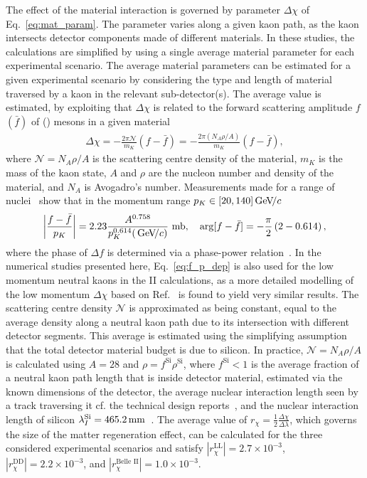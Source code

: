 The effect of the material interaction is governed by parameter $\Delta\chi$ of Eq.~\eqref{eq:mat_param}. The parameter varies along a given kaon path, as the kaon intersects detector components made of different materials. In these studies, the calculations are simplified by using a single average material parameter for each experimental scenario. The average material parameters can be estimated for a given experimental scenario by considering the type and length of material traversed by a kaon in the relevant sub-detector(s). The average value is estimated, by exploiting that $\Delta\chi$ is related to the forward scattering amplitude $f$ $(\bar f)$ of \Kz (\Kzb) mesons in a given material~\cite{goodRelationScatteringAbsorption1957,fetscherRegenerationArbitraryCoherent1996}
\begin{align}\label{eq:mat_delta_chi}
    \Delta \chi = - \frac{2\pi \mathcal{N}}{m_K}(f-\bar f) = - \frac{2\pi (N_A \rho/A)}{m_K}(f-\bar f),
\end{align}
where $\mathcal{N}=N_A\rho/A$ is the scattering centre density of the material, $m_K$ is the mass of the kaon state,  $A$ and $\rho$ are the nucleon number and density of the material, and $N_A$ is Avogadro's number.
Measurements made for a range of nuclei~\cite{Gsponer1979} show that in the momentum range $p_K\in [20, 140]\text{\,Ge\kern -0.1em V\!/}c$
\begin{align} \label{eq:f_p_dep}
    \left|\frac{f-\bar f}{p_K}\right| = 2.23 \frac{A^{0.758}} {p_K^{0.614} (\text{\,Ge\kern -0.1em V\!/}c)} \text{ mb}, \quad \arg [f - \bar f] = -\frac{\pi}{2}\left(2-0.614\right),
\end{align}
where the phase of $\Delta f$ is determined via a phase-power relation~\cite{Briere1995}. In the numerical studies presented here, Eq.~\eqref{eq:f_p_dep} is also used for the low momentum neutral kaons in the \belle II calculations, as a more detailed modelling of the low momentum $\Delta\chi$ based on Ref.~\cite{Ko2011} is found to yield very similar results. The scattering centre density $\mathcal{N}$ is approximated as being constant, equal to the average density along a neutral kaon path due to its intersection with different detector segments. This average is estimated using the simplifying assumption that the total detector material budget is due to silicon. In practice, $\mathcal{N}=N_A\rho/A$ is calculated using $A=28$ and $\rho = f^\text{Si}\rho^\text{Si}$, where $f^\text{Si}<1$ is the average fraction of a neutral kaon path length that is inside detector material, estimated via the known dimensions of the detector, the average nuclear interaction length seen by a track traversing it cf. the technical design reports~\cite{CERN-LHCC-2003-030,LHCb-2004-121}, and the nuclear interaction length of silicon $\lambda_I^\text{Si}=465.2\text{\,mm}$~\cite{PDG2020}. 
The average value of $r_\chi=\frac{1}{2}\frac{\Delta\chi}{\Delta\lambda}$, which governs the size of the matter regeneration effect, can be calculated for the three considered experimental scenarios and satisfy $|r_\chi^\text{LL}|=2.7\times10^{-3}$, $|r_\chi^\text{DD}|=2.2\times10^{-3}$, and ${|r_\chi^\text{Belle II}|=1.0\times10^{-3}}$. 

